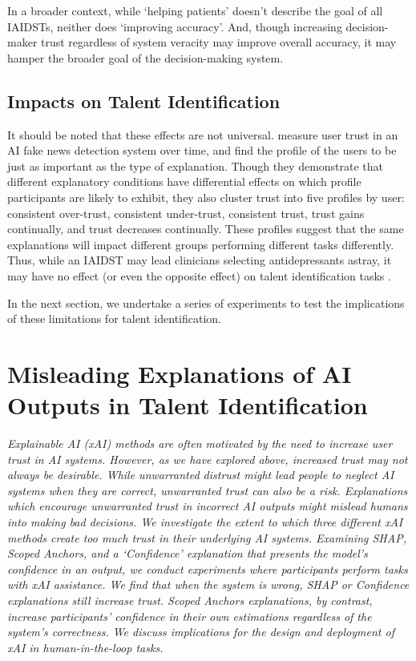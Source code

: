 In a broader context, while `helping patients' doesn't describe the goal of all IAIDSTs, neither does `improving accuracy'. And, though increasing decision-maker trust regardless of system veracity may improve overall accuracy, it may hamper the broader goal of the decision-making system.

\subsection{Impacts on Talent Identification}
It should be noted that these effects are not universal. \textcite{mohseni_trust_nodate} measure user trust in an AI fake news detection system over time, and find the profile of the users to be just as important as the type of explanation. Though they demonstrate that different explanatory conditions have differential effects on which profile participants are likely to exhibit, they also cluster trust into five profiles by user: consistent over-trust, consistent under-trust, consistent trust, trust gains continually, and trust decreases continually. These profiles suggest that the same explanations will impact different groups performing different tasks differently. Thus, while an IAIDST may lead clinicians selecting antidepressants astray, it may have no effect (or even the opposite effect) on talent identification tasks \cite{mohseni_trust_nodate}.

In the next section, we undertake a series of experiments to test the implications of these limitations for talent identification.

\section{Misleading Explanations of AI Outputs in Talent Identification}
\emph{Explainable AI (xAI) methods are often motivated by the need to increase user trust in AI systems. However, as we have explored above, increased trust may not always be desirable. While unwarranted distrust might lead people to neglect AI systems when they are correct, unwarranted trust can also be a risk. Explanations which encourage unwarranted trust in incorrect AI outputs might mislead humans into making bad decisions. We investigate the extent to which three different xAI methods create too much trust in their underlying AI systems. Examining SHAP, Scoped Anchors, and a `Confidence' explanation that presents the model's confidence in an output, we conduct experiments where participants perform tasks with xAI assistance. We find that when the system is wrong, SHAP or Confidence explanations still increase trust. Scoped Anchors explanations, by contrast, increase participants' confidence in their own estimations regardless of the system's correctness. We discuss implications for the design and deployment of xAI in human-in-the-loop tasks.}


